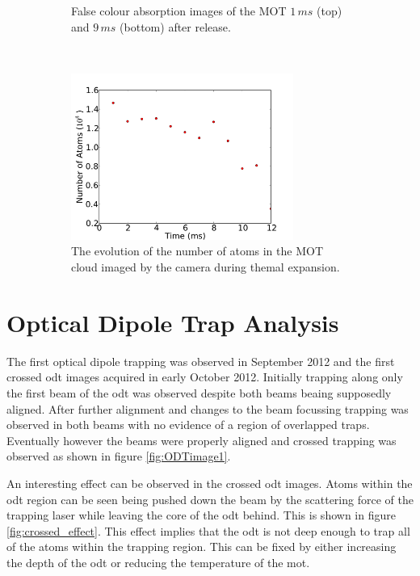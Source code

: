 \begin{figure}[t]
\begin{subfigure}[b]{0.3\textwidth}
    \caption{False colour absorption images of the MOT $1\,\unit{ms}$ (top) and $9\,\unit{ms}$ (bottom) after release.}
    \label{fig:mot_example_images}
    \end{subfigure}~~~\begin{subfigure}[b]{0.6\textwidth}
    \centering
    \includegraphics[width=0.8\textwidth]{figs/MOT_atom_count.pdf}
    \caption{The evolution of the number of atoms in the MOT cloud imaged by the camera during themal expansion.}
    \label{fig:mot_atom_count}
    \end{subfigure}
    \caption{}
\end{figure}

\section{Optical Dipole Trap Analysis}
The first optical dipole trapping was observed in September 2012 and the first crossed \gls{odt} images acquired in early October 2012. Initially trapping along only the first beam of the \gls{odt} was observed despite both beams beaing supposedly aligned. After further alignment and changes to the beam focussing trapping was observed in both beams with no evidence of a region of overlapped traps. Eventually however the beams were properly aligned and crossed trapping was observed as shown in figure \ref{fig:ODTimage1}.

An interesting effect can be observed in the crossed \gls{odt} images. Atoms within the \gls{odt} region can be seen being pushed down the beam by the scattering force of the trapping laser while leaving the core of the \gls{odt} behind. This is shown in figure \ref{fig:crossed_effect}. This effect implies that the \gls{odt} is not deep enough to trap all of the atoms within the trapping region. This can be fixed by either increasing the depth of the \gls{odt} or reducing the temperature of the \gls{mot}.

